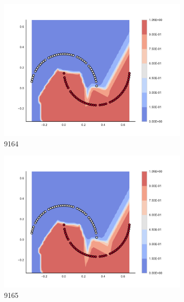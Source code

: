 \begin{figure}[h]
\begin{subfigure}[b]{0.09\textwidth}
    \includegraphics[clip, trim=2.35cm 1.75cm 4.5cm 0cm,width=\textwidth]{img/convergence/9164.pdf}
    \caption{9164}
    \label{fig:convergence_9164}
\end{subfigure}
%
\begin{subfigure}[b]{0.09\textwidth}
    \includegraphics[clip, trim=2.35cm 1.75cm 4.5cm 0cm,width=\textwidth]{img/convergence/9165.pdf}
    \caption{9165}
    \label{fig:convergence_9165}
\end{subfigure}
%
\begin{subfigure}[b]{0.09\textwidth}

\end{subfigure}
\end{figure}
